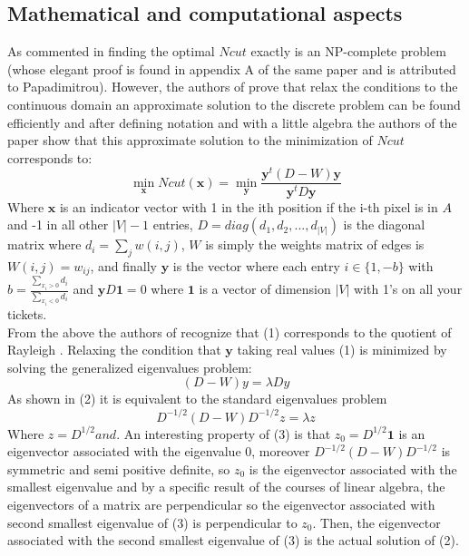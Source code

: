 \documentclass[conference]{IEEEtran}
\begin{document}
\subsection{Mathematical and computational aspects}
As commented in \cite{Ncut} finding the optimal $ Ncut $ exactly is an NP-complete problem (whose elegant proof is found in appendix A of the same paper \cite{Ncut} and is attributed to Papadimitrou). However, the authors of \cite{Ncut} prove that relax the conditions to the continuous domain an approximate solution to the discrete problem can be found efficiently and after defining notation and with a little algebra the authors of the paper show that this approximate solution to the minimization of $ Ncut $ corresponds to:
\begin{equation}
\min_{\boldsymbol{x}}Ncut(\boldsymbol{x}) = \min_{\boldsymbol{y}} \frac{\boldsymbol{y}^t(D-W)\boldsymbol{y}}{\boldsymbol{y}^tD\boldsymbol{y}}
\end{equation}
Where $ \boldsymbol {x} $ is an indicator vector with 1 in the ith position if the i-th pixel is in $ A $ and -1 in all other $ | V | -1 $ entries, $ D = diag (d_1, d_2, ..., d_ {| V |}) $ is the diagonal matrix where $ d_i = \sum_j w (i, j) $, $ W $ is simply the weights matrix of edges is $ W (i, j) = w_{ij} $, and finally $ \boldsymbol {y} $ is the vector where each entry $ i \in \{1, -b \} $ with $ b = \frac {\sum_ {x_i> 0} d_i} {\sum_ {x_i <0} d_i} $ and $ \boldsymbol {y} D \boldsymbol {1} = 0 $ where $ \boldsymbol {1} $ is a vector of dimension $ | V | $ with 1's on all your tickets. \\
From the above the authors of \cite{Ncut} recognize that (1) corresponds to the quotient of Rayleigh \cite{MatrixC}. Relaxing the condition that $  \boldsymbol {y} $
taking real values (1) is minimized by solving the generalized eigenvalues problem:
\begin{equation}
(D-W)y = \lambda D y
\end{equation}
As shown in \cite{Ncut} (2) it is equivalent to the standard eigenvalues problem
\begin{equation}
D^{-1/2}(D-W)D^{-1/2}z = \lambda z
\end{equation}
Where $ z = D ^ {1/2} and $. An interesting property of (3) is that $ z_0 = D ^ {1/2} \boldsymbol {1} $ is an eigenvector associated with the eigenvalue 0, moreover $ D ^ {-1/2} (D-W) D ^ {- 1/2} $ is symmetric and semi positive definite, so $ z_0 $ is the eigenvector associated with the smallest eigenvalue and by a specific result of the courses of linear algebra, the eigenvectors of a matrix are perpendicular so the eigenvector associated with second smallest eigenvalue of (3) is perpendicular to $ z_0 $. Then, the eigenvector associated with the second smallest eigenvalue of (3) is the actual solution of (2). \\
\end{document}
